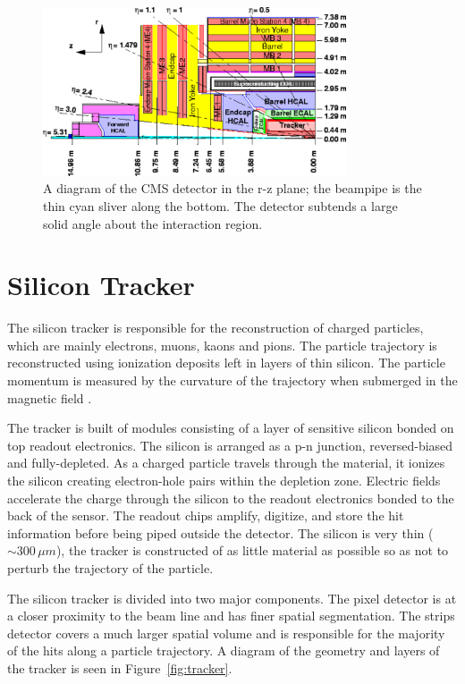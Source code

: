 \begin{figure}[hbp!]
\centering
\includegraphics[width=0.8\textwidth]{figs/img41.pdf}
\caption[A diagram of the CMS detector in the r-z plane.]{A diagram of the CMS detector in the r-z plane; the beampipe is the thin cyan sliver along the bottom. The detector subtends a large solid angle about the interaction region.}
\label{fig:detectoreta}
\end{figure}

\section{Silicon Tracker}

The silicon tracker is responsible for the reconstruction of charged particles, which are mainly electrons, muons, kaons and pions. The particle trajectory is reconstructed using ionization deposits left in layers of thin silicon. The particle momentum is measured by the curvature of the trajectory when submerged in the magnetic field \cite{trackertdr, trackertdradd}.

The tracker is built of modules consisting of a layer of sensitive silicon bonded on top readout electronics. The silicon is arranged as a p-n junction, reversed-biased and fully-depleted. As a charged particle travels through the material, it ionizes the silicon creating electron-hole pairs within the depletion zone. Electric fields accelerate the charge through the silicon to the readout electronics bonded to the back of the sensor. The readout chips amplify, digitize, and store the hit information before being piped outside the detector. The silicon is very thin ($\sim300\,\mu m$), the tracker is constructed of as little material as possible so as not to perturb the trajectory of the particle.

The silicon tracker is divided into two major components. The pixel detector is at a closer proximity to the beam line and has finer spatial segmentation. The strips detector covers a much larger spatial volume and is responsible for the majority of the hits along a particle trajectory. A diagram of the geometry and layers of the tracker is seen in Figure~\ref{fig:tracker}.

